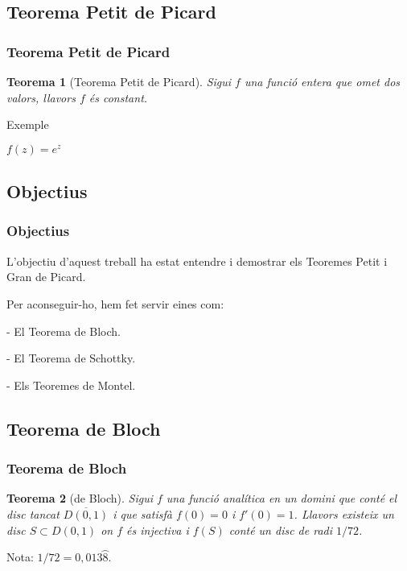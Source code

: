 \documentclass{beamer}
\newtheorem{teorema}{Teorema}[section]
\begin{document}

\subsection{Teorema Petit de Picard}
\begin{frame}
\frametitle{Teorema Petit de Picard}
\begin{teorema}[Teorema Petit de Picard]
Sigui $f$ una funció entera que omet dos valors, llavors $f$ és constant.
\end{teorema}

\begin{exampleblock}{Exemple}
\begin{center}
    $f(z)=e^z$
\end{center}
\end{exampleblock}

\end{frame}


\subsection{Objectius}
\begin{frame}
\frametitle{Objectius}

L'objectiu d'aquest treball ha estat entendre i demostrar els Teoremes Petit i Gran de Picard. 
\vspace{5mm}

Per aconseguir-ho, hem fet servir eines com:
 
 - El Teorema de Bloch.
 
 - El Teorema de Schottky.

 - Els Teoremes de Montel.


\end{frame}


\subsection{Teorema de Bloch}
\begin{frame}
\frametitle{Teorema de Bloch}

\begin{teorema}[de Bloch]
Sigui $f$ una funció analítica en un domini que conté el disc tancat $\overline{D(0,1)}$ i que satisfà $f(0)=0$ i $f'(0)=1$. Llavors existeix un disc $S \subset D(0,1)$ on $f$ és injectiva i $f(S)$ conté un disc de radi $1/72$.
\end{teorema}

Nota: $1/72 = 0,013\wideparen{8}$.

\end{frame}
\end{document}
